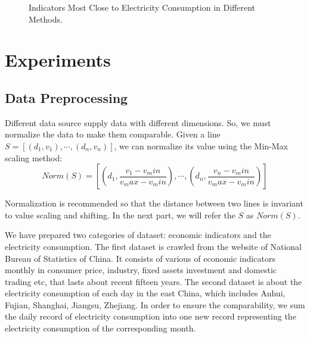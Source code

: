 
\begin{figure}[!t]
	\vspace{-2em}
	\hspace*{-1em}
	\hspace*{-1em}
	\hspace*{-1em}
	\hspace*{-1em}
	\vspace{-1.5em}
	\caption{Indicators Most Close to Electricity Consumption in Different Methods. \label{fig:closeindi}}
	\vspace{-1.5em}
\end{figure}

\section{Experiments} \label{sec:exp}
\subsection{Data Preprocessing}
Different data source supply data with different dimensions. So, we must normalize the data to make them comparable. 
Given a line $S = [(d_1, v_1), \cdots, (d_n, v_n)]$, we can normalize its value using the Min-Max scaling method:
\begin{equation}
	Norm(S) = [(d_1, \frac{v_1 - v_min}{v_max - v_min}), \cdots, (d_n, \frac{v_n - v_min}{v_max - v_min})]
\end{equation}

Normalization is recommended so that the distance between two lines is invariant to value scaling and shifting. In the next part, we will refer the $S$ as $Norm(S)$. 

We have prepared two categories of dataset: economic indicators and the electricity consumption. The first dataset is crawled from the website of National Bureau of Statistics of China. It consists of various of economic indicators monthly in consumer price, industry, fixed assets investment and domestic trading etc, that lasts about recent fifteen years. The second dataset is about the electricity consumption of each day in the east China, which includes Anhui, Fujian, Shanghai, Jiangsu, Zhejiang. In order to ensure the comparability, we sum the daily record of electricity consumption into one new record representing the electricity consumption of the corresponding month. 

